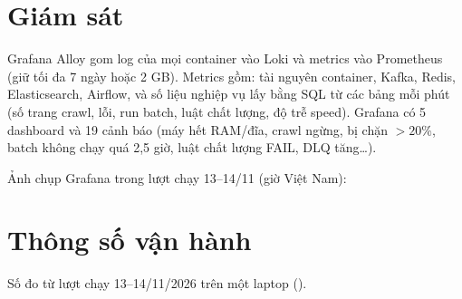 \documentclass[11pt,a4paper]{article}
\begin{document}

\section{Giám sát}
Grafana Alloy gom log của mọi container vào Loki và metrics vào Prometheus (giữ tối đa 7 ngày hoặc 2 GB). Metrics gồm: tài nguyên container,
Kafka, Redis, Elasticsearch, Airflow, và số liệu nghiệp vụ lấy bằng SQL từ các bảng  mỗi phút
(số trang crawl, lỗi, run batch, luật chất lượng, độ trễ speed). Grafana có 5 dashboard và 19 cảnh báo
(máy hết RAM/đĩa, crawl ngừng, bị chặn $> 20\%$, batch không chạy quá 2,5 giờ, luật chất lượng FAIL, DLQ tăng\ldots).

{\setlength{\figw}{1.25\linewidth}}

Ảnh chụp Grafana trong lượt chạy 13--14/11 (giờ Việt Nam):


\section{Thông số vận hành}
Số đo từ lượt chạy 13--14/11/2026 trên một laptop ().

\end{document}
